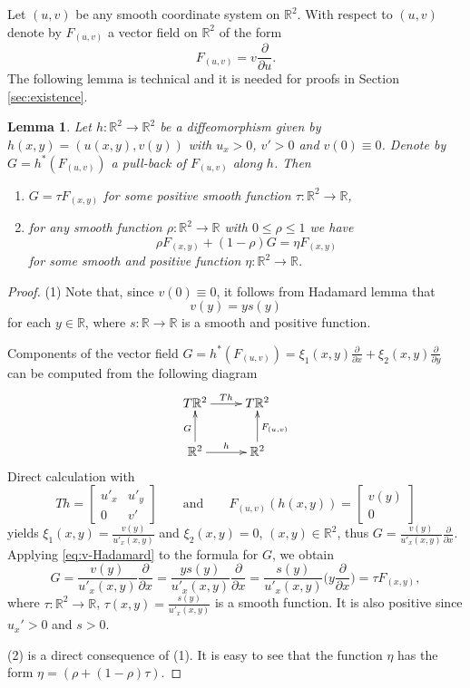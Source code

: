 \documentclass[10pt,reqno]{amsart}
\newtheorem{lemma}[subsection]{Lemma}
\newcommand{\bbR}{\mathbb{R}}
\begin{document}
{Let $(u,v)$ be any smooth coordinate system on $\bbR^2$. With respect to $(u,v)$ denote by $F_{(u,v)}$ a vector field on $\bbR^2$ of the form 
$$
F_{(u,v)} = v\frac{\partial}{\partial u}.
$$
The following lemma is technical and it is needed for  proofs in Section \ref{sec:existence}.
\begin{lemma}\label{lm:technical-lema}
	Let $h:\mathbb{R}^2\to \bbR^2$ be a diffeomorphism given by $h(x,y) = (u(x,y), v(y))$ with $u_x >0$, $v'>0$ and $v(0) \equiv 0$. Denote by  $G = h^*(F_{(u,v)})$  a pull-back of $F_{(u,v)}$ along $h$. Then 
	\begin{enumerate}
		\item $G = \tau F_{(x,y)}$ for some positive smooth function $\tau:\bbR^2\to \bbR$,
		\item for any smooth  function $\rho:\bbR^2\to \bbR$ with $0\leq \rho\leq 1$ we have 
		$$
		\rho F_{(x,y)}+(1-\rho) G = \eta F_{(x,y)}
		$$
		 for some smooth and positive function $\eta:\mathbb{R}^2\to \bbR$.
	\end{enumerate}
\end{lemma}

\begin{proof}
(1)	Note that, since $v(0) \equiv 0$, it follows from Hadamard lemma that 
	\begin{equation}\label{eq:v-Hadamard}
		v(y) = ys(y)
	\end{equation}
	for each $y\in \mathbb{R}$, where $s:\mathbb{R}\to \mathbb{R}$ is a smooth and positive function. 

	Components of the vector field $G = h^*(F_{(u,v)}) =  \xi_1(x,y)\frac{\partial}{\partial x}+\xi_2(x,y)\frac{\partial}{\partial y}$  can be computed from the following diagram
	 $$
	 \xymatrix{
	T\bbR^2 \ar[r]^{Th} & T\bbR^2\\
	\bbR^2\ar[r]^h \ar[u]^{G} 	 &	\bbR^2\ar[u]_{F_{(u,v)}}
}
	 $$
	Direct calculation with 
	$$
	Th = \begin{bmatrix}
		u'_x& u'_y\\
		0& v'
	\end{bmatrix}
\qquad\text{and}\qquad F_{(u,v)}(h(x,y)) = \begin{bmatrix}
	v(y)\\0
\end{bmatrix}
	$$
yields $\xi_1(x,y) = \frac{v(y)}{u'_x(x,y)}$ and $\xi_2(x,y) = 0$, $(x,y)\in\bbR^2$, thus $G = \frac{v(y)}{u'_x(x,y)}\frac{\partial}{\partial x}.$ Applying \eqref{eq:v-Hadamard} to the formula for $G$, we obtain
	$$
	G =  \frac{v(y)}{u'_x(x,y)}\frac{\partial}{\partial x} = \frac{ys(y)}{u'_x(x,y)}\frac{\partial}{\partial x} = \frac{s(y)}{u'_x(x,y)}\Big(y\frac{\partial}{\partial x}\Big) = \tau F_{(x,y)},
	$$
	where $\tau:\bbR^2\to \bbR$, $\tau(x,y) = \frac{s(y)}{u'_x(x,y)}$ is a  smooth function. It is also positive since $u_x'>0$ and $s>0$.
	
	(2) is a direct consequence of (1). It is easy to see that the function $\eta$ has the form  $\eta = (\rho + (1-\rho)\tau)$.
\end{proof}
}
\end{document}
